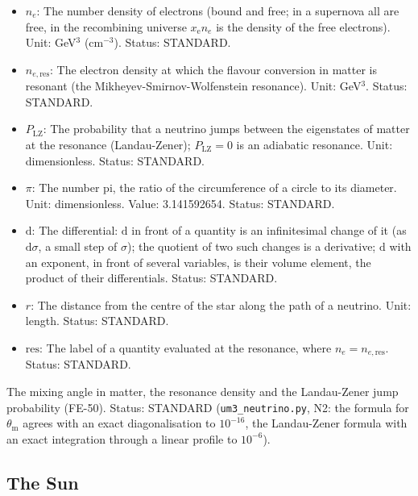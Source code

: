 \documentclass[
  10pt,
]{article}
\begin{document}
\begin{itemize}
  GeV\(^{-2}\). Status: DERIVED.
\item
  \(n_e\): The number density of electrons (bound and free; in a
  supernova all are free, in the recombining universe
  \(x_{\mathrm{e}}n_e\) is the density of the free electrons). Unit:
  GeV\(^3\) (cm\(^{-3}\)). Status: STANDARD.
\item
  \(n_{e,\mathrm{res}}\): The electron density at which the flavour
  conversion in matter is resonant (the Mikheyev-Smirnov-Wolfenstein
  resonance). Unit: GeV\(^3\). Status: STANDARD.
\item
  \(P_{\mathrm{LZ}}\): The probability that a neutrino jumps between the
  eigenstates of matter at the resonance (Landau-Zener);
  \(P_{\mathrm{LZ}} = 0\) is an adiabatic resonance. Unit:
  dimensionless. Status: STANDARD.
\item
  \(\pi\): The number pi, the ratio of the circumference of a circle to
  its diameter. Unit: dimensionless. Value: 3.141592654. Status:
  STANDARD.
\item
  \(\mathrm{d}\): The differential: \(\mathrm{d}\) in front of a
  quantity is an infinitesimal change of it (as \(\mathrm{d}\sigma\), a
  small step of \(\sigma\)); the quotient of two such changes is a
  derivative; \(\mathrm{d}\) with an exponent, in front of several
  variables, is their volume element, the product of their
  differentials. Status: STANDARD.
\item
  \(r\): The distance from the centre of the star along the path of a
  neutrino. Unit: length. Status: STANDARD.
\item
  \(\mathrm{res}\): The label of a quantity evaluated at the resonance,
  where \(n_e = n_{e,\mathrm{res}}\). Status: STANDARD.
\end{itemize}

The mixing angle in matter, the resonance density and the Landau-Zener
jump probability (FE-50). Status: STANDARD (\texttt{um3\_neutrino.py},
N2: the formula for \(\theta_{\mathrm{m}}\) agrees with an exact
diagonalisation to \(10^{-16}\), the Landau-Zener formula with an exact
integration through a linear profile to \(10^{-6}\)).

\hypertarget{the-sun}{%
\subsection{The Sun}\label{the-sun}}
\end{document}
